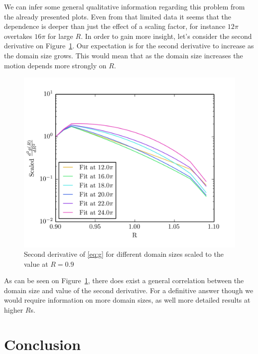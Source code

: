 \documentclass[11pt,a4paper]{article}
\begin{document}
We can infer some general qualitative information regarding this problem from the already presented plots.
Even from that limited data it seems that the dependence is deeper than just the effect of a scaling factor, for instance $12\pi$ overtakes $16\pi$ for large $R$.
In order to gain more insight, let's consider the second derivative on Figure~\ref{img:2der}.
Our expectation is for the second derivative to increase as the domain size grows.
This would mean that as the domain size increases the motion depends more strongly on $R$.

\begin{figure}[h!]
    \centering
    \includegraphics[width=\textwidth]{scaled_fit}
    \caption{Second derivative of \eqref{eq:g} for different domain sizes scaled to the value at $R=0.9$}\label{img:2der}
\end{figure}

As can be seen on Figure~\ref{img:2der}, there does exist a general correlation between the domain size and value of the second derivative.
For a definitive answer though we would require information on more domain sizes, as well more detailed results at higher $R$s.

\section{Conclusion}

\newpage


\end{document}
